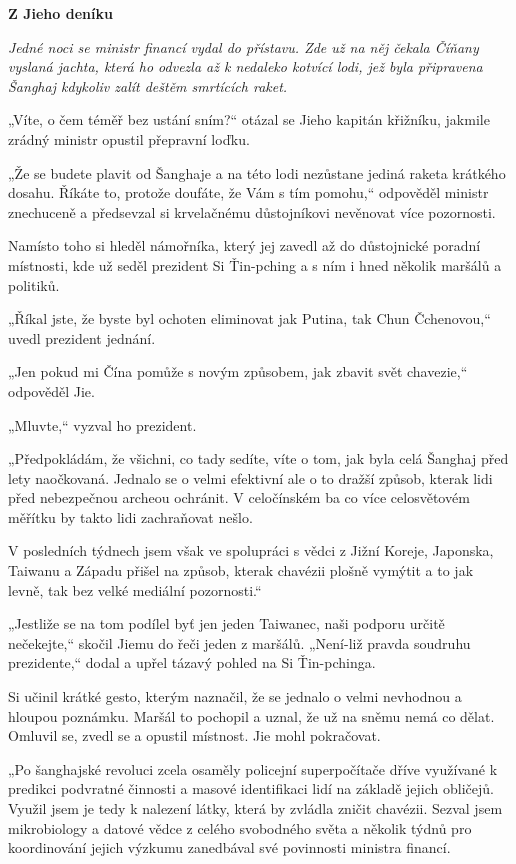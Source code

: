 \vspace{0.75cm}
\textbf{Z Jieho deníku}
\vspace{0.75cm}

{\itshape
Jedné noci se ministr financí vydal do přístavu. Zde už na něj čekala Číňany vyslaná jachta, která ho odvezla až k nedaleko kotvící lodi, jež byla připravena Šanghaj kdykoliv zalít deštěm smrtících raket.

„Víte, o čem téměř bez ustání sním?“ otázal se Jieho kapitán křižníku, jakmile zrádný ministr opustil přepravní loďku.

„Že se budete plavit od Šanghaje a na této lodi nezůstane jediná raketa krátkého dosahu. Říkáte to, protože doufáte, že Vám s tím pomohu,“ odpověděl ministr znechuceně a předsevzal si krvelačnému důstojníkovi nevěnovat více pozornosti.

Namísto toho si hleděl námořníka, který jej zavedl až do důstojnické poradní místnosti, kde už seděl prezident Si Ťin-pching a s ním i hned několik maršálů a politiků.

„Říkal jste, že byste byl ochoten eliminovat jak Putina, tak Chun Čchenovou,“ uvedl prezident jednání. 

„Jen pokud mi Čína pomůže s novým způsobem, jak zbavit svět chavezie,“ odpověděl Jie.

„Mluvte,“ vyzval ho prezident.

„Předpokládám, že všichni, co tady sedíte, víte o tom, jak byla celá Šanghaj před lety naočkovaná. Jednalo se o velmi efektivní ale o to dražší způsob, kterak lidi před nebezpečnou archeou ochránit. V celočínském ba co více celosvětovém měřítku by takto lidi zachraňovat nešlo.

V posledních týdnech jsem však ve spolupráci s vědci z Jižní Koreje, Japonska, Taiwanu a Západu přišel na způsob, kterak chavézii plošně vymýtit a to jak levně, tak bez velké mediální pozornosti.“

„Jestliže se na tom podílel byť jen jeden Taiwanec, naši podporu určitě nečekejte,“ skočil Jiemu do řeči jeden z maršálů. „Není-liž pravda soudruhu prezidente,“ dodal a upřel tázavý pohled na Si Ťin-pchinga.

Si učinil krátké gesto, kterým naznačil, že se jednalo o velmi nevhodnou a hloupou poznámku. Maršál to pochopil a uznal, že už na sněmu nemá co dělat. Omluvil se, zvedl se a opustil místnost. Jie mohl pokračovat.

„Po šanghajské revoluci zcela osaměly policejní superpočítače dříve využívané k predikci podvratné činnosti a masové identifikaci lidí na základě jejich obličejů. Využil jsem je tedy k nalezení látky, která by zvládla zničit chavézii. Sezval jsem mikrobiology a datové vědce z celého svobodného světa a několik týdnů pro koordinování jejich výzkumu zanedbával své povinnosti ministra financí. 

}
